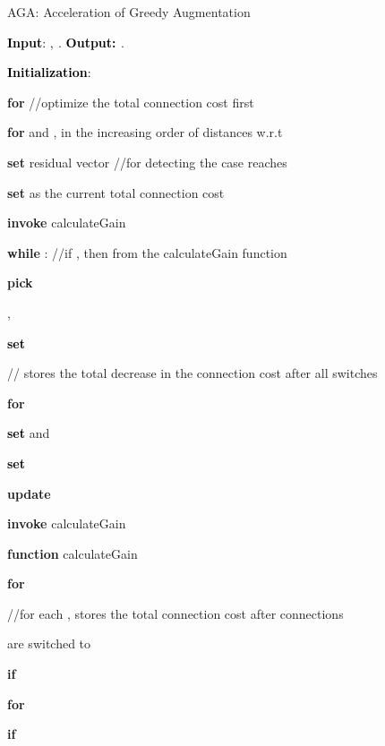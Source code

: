 \documentclass[10pt]{llncs}
\begin{document}
\begin{algorithm}[H]
\caption{AGA: Acceleration of Greedy Augmentation}


\textbf{\textcolor{black}{Input}}\textcolor{black}{: }\textcolor{black}{,}\textbf{\textcolor{black}{{}
}}. \textbf{\textcolor{black}{Output:
}}.

\textbf{\textcolor{black}{Initialization}}\textcolor{black}{: }

\textbf{for  }//optimize the total connection cost
first

\qquad{}\textbf{for  }and , in the increasing
order of distances w.r.t 

\qquad{}\qquad{}

\qquad{}\qquad{}

\textbf{set} residual vector 
//for detecting the case  reaches 

\textbf{set} 
as the current total connection cost

\textbf{invoke} calculateGain

\medskip{}


\textbf{while} : //if
, then  from the calculateGain
function

\qquad{}\textbf{pick} 

\qquad{}

\qquad{} 

\qquad{},


\qquad{}\textbf{\textcolor{black}{set}} 

\qquad{} // stores the total decrease
in the connection cost after all switches

\qquad{}\textbf{for }

\qquad{}\qquad{}

\qquad{}\qquad{}\textbf{\textcolor{black}{set}} 
and 

\qquad{}\textbf{\textcolor{black}{set}} 

\qquad{}\textbf{update }

\qquad{}\textbf{invoke} calculateGain

\medskip{}


\textbf{function} calculateGain

\qquad{}\textbf{for }

\qquad{}\qquad{} //for each , 
stores the total connection cost after connections 

\qquad{}\qquad{}are switched to 

\qquad{}\qquad{}

\qquad{}\qquad{}\textbf{if }

\qquad{}\qquad{}\qquad{}\textbf{for }

\qquad{}\qquad{}\qquad{}\qquad{}\textbf{if }

\qquad{}\qquad{}\qquad{}\qquad{}\qquad{}

\qquad{}\qquad{}\qquad{}
\end{algorithm}
\end{document}
